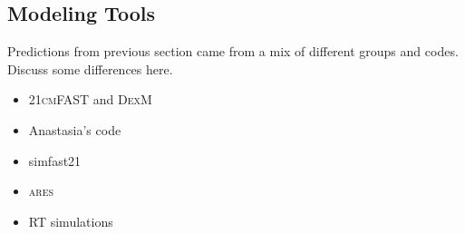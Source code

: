 \subsection{Modeling Tools} \label{sec:codes}
Predictions from previous section came from a mix of different groups and codes. Discuss some differences here.

\begin{itemize}
	\item \textsc{21cmFAST} and \textsc{DexM}
	\item Anastasia's code
	\item simfast21
	\item \textsc{ares}	
	\item RT simulations
\end{itemize}






